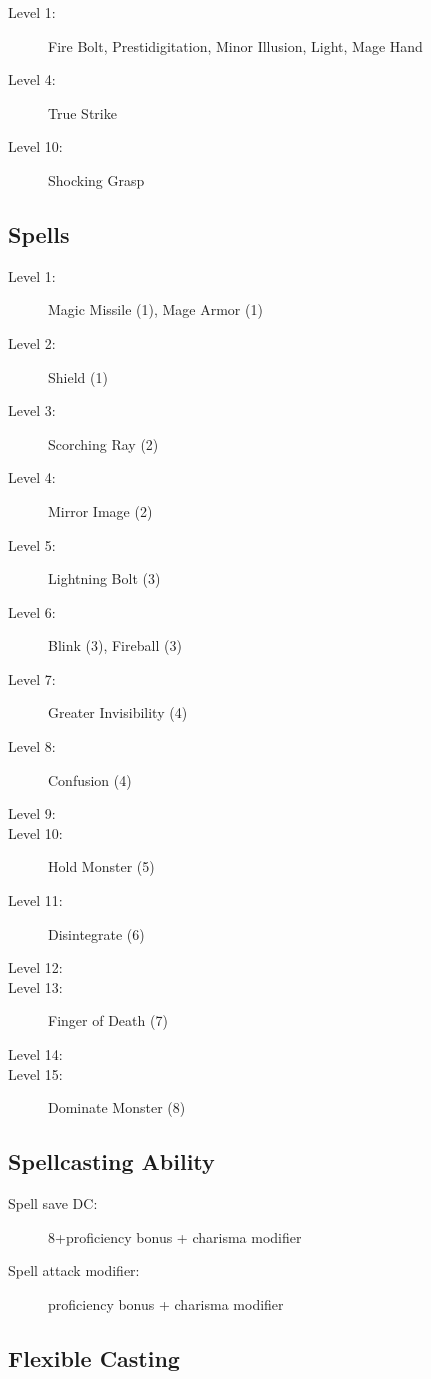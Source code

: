 \documentclass[letterpaper,10pt,twoside,twocolumn,openany]{book}
\begin{document}
\begin{description}
	\item[Level 1:] Fire Bolt, Prestidigitation, Minor Illusion, Light, Mage Hand
	\item[Level 4:] True Strike
	\item[Level 10:] Shocking Grasp
\end{description}

\subsection{Spells}

\begin{description}
	\item[Level 1:] Magic Missile (1), Mage Armor (1)
	\item[Level 2:] Shield (1)
	\item[Level 3:] Scorching Ray (2)	 
	\item[Level 4:] Mirror Image (2)
	\item[Level 5:] Lightning Bolt (3)
	\item[Level 6:] Blink (3), Fireball (3)
	\item[Level 7:] Greater Invisibility (4)
	\item[Level 8:] Confusion (4)
	\item[Level 9:] 
	\item[Level 10:] Hold Monster (5)
	\item[Level 11:] Disintegrate (6)
	\item[Level 12:]
	\item[Level 13:] Finger of Death (7)
	\item[Level 14:] 
	\item[Level 15:] Dominate Monster (8)
\end{description}

\subsection{Spellcasting Ability}

\begin{description}
	\item[Spell save DC:] 8+proficiency bonus + charisma modifier
	\item[Spell attack modifier:] proficiency bonus + charisma modifier
\end{description}

\subsection{Flexible Casting}
\end{document}
